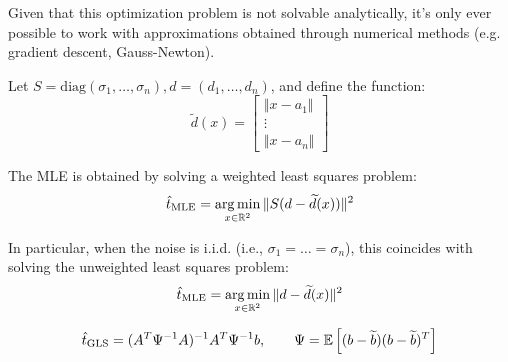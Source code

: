 Given that this optimization problem is not solvable analytically, it's only ever possible to work with approximations obtained through numerical methods (e.g. gradient descent, Gauss-Newton).

\pagebreak
\noindent
Let $S = \mathrm{diag}(\sigma_1, \dots, \sigma_n), d=(d_1, \dots, d_n)$, and define the function:
\[
    \widetilde d(x) = \begin{bmatrix}
        \Vert x-a_1\Vert \\
        \vdots \\
        \Vert x-a_n\Vert
    \end{bmatrix}
\]

The MLE is obtained by solving a weighted least squares problem:
\[
    \hat t_\text{MLE} = \operatorname*{arg\,min}_{x\in\mathbb R^2} \Vert S(d-\widetilde d(x))\Vert^2 
\]

In particular, when the noise is i.i.d. (i.e., $\sigma_1=\dots=\sigma_n$), this coincides with solving the unweighted least squares problem:
\[
    \hat t_\text{MLE} = \operatorname*{arg\,min}_{x\in\mathbb R^2} \Vert d-\widetilde d(x)\Vert^2
\]

\vskip 1cm

\[
    \hat t_\text{GLS} = (A^T\Psi^{-1}A)^{-1}A^T\Psi^{-1}b, \qquad \Psi = \mathbb E\left[(b-\widetilde b)(b-\widetilde b)^T\right]
\]

